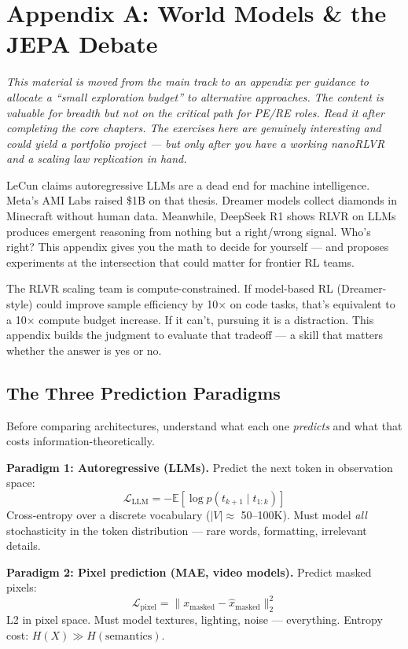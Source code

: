 \newpage
\section*{Appendix A: World Models \& the JEPA Debate}

\textit{This material is moved from the main track to an appendix per guidance to allocate a ``small exploration budget'' to alternative approaches. The content is valuable for breadth but not on the critical path for PE/RE roles. Read it after completing the core chapters. The exercises here are genuinely interesting and could yield a portfolio project --- but only after you have a working nanoRLVR and a scaling law replication in hand.}

LeCun claims autoregressive LLMs are a dead end for machine intelligence. Meta's AMI Labs raised \$1B on that thesis. Dreamer models collect diamonds in Minecraft without human data. Meanwhile, DeepSeek R1 shows RLVR on LLMs produces emergent reasoning from nothing but a right/wrong signal. Who's right? This appendix gives you the math to decide for yourself --- and proposes experiments at the intersection that could matter for frontier RL teams.

\begin{whythis}
The RLVR scaling team is compute-constrained. If model-based RL (Dreamer-style) could improve sample efficiency by 10$\times$ on code tasks, that's equivalent to a 10$\times$ compute budget increase. If it can't, pursuing it is a distraction. This appendix builds the judgment to evaluate that tradeoff --- a skill that matters whether the answer is yes or no.
\end{whythis}

\subsection*{The Three Prediction Paradigms}

Before comparing architectures, understand what each one \textit{predicts} and what that costs information-theoretically.

\textbf{Paradigm 1: Autoregressive (LLMs).} Predict the next token in observation space:
$$\mathcal{L}_{\text{LLM}} = -\mathbb{E}\left[\log p(t_{k+1} \mid t_{1:k})\right]$$
Cross-entropy over a discrete vocabulary ($|V| \approx$ 50--100K). Must model \textit{all} stochasticity in the token distribution --- rare words, formatting, irrelevant details.

\textbf{Paradigm 2: Pixel prediction (MAE, video models).} Predict masked pixels:
$$\mathcal{L}_{\text{pixel}} = \|x_{\text{masked}} - \hat{x}_{\text{masked}}\|_2^2$$
L2 in pixel space. Must model textures, lighting, noise --- everything. Entropy cost: $H(X) \gg H(\text{semantics})$.

